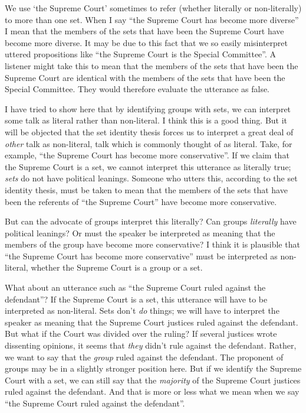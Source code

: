 \documentclass[11pt]{article}
\begin{document}
\begin{spacing}{1.5}
We use `the Supreme Court' sometimes to refer (whether literally or
non-literally) to more than one set.  When I say ``the Supreme Court
has become more diverse'' I mean that the members of the sets that
have been the Supreme Court have become more diverse.  It may be due
to this fact that we so easily misinterpret uttered propositions like
``the Supreme Court is the Special Committee''.  A listener might take
this to mean that the members of the sets that have been the Supreme
Court are identical with the members of the sets that have been the
Special Committee.  They would therefore evaluate the utterance as
false.

I have tried to show here that by identifying groups with sets, we can
interpret some talk as literal rather than non-literal.  I think this
is a good thing.  But it will be objected that the set identity thesis
forces us to interpret a great deal of {\em other} talk as
non-literal, talk which is commonly thought of as literal.  Take, for
example, ``the Supreme Court has become more conservative''.  If we
claim that the Supreme Court is a set, we cannot interpret this
utterance as literally true; {\em sets} do not have political
leanings.  Someone who utters this, according to the set identity
thesis, must be taken to mean that the members of the sets that have
been the referents of ``the Supreme Court'' have become more
conservative.

But can the advocate of groups interpret this literally?  Can groups
{\em literally} have political leanings?  Or must the speaker be
interpreted as meaning that the members of the group have become more
conservative?  I think it is plausible that ``the Supreme Court has
become more conservative'' must be interpreted as non-literal, whether
the Supreme Court is a group or a set.

What about an utterance such as ``the Supreme Court ruled against the
defendant''?  If the Supreme Court is a set, this utterance will have
to be interpreted as non-literal.  Sets don't {\em do} things; we will
have to interpret the speaker as meaning that the Supreme Court
justices ruled against the defendant.  But what if the Court was
divided over the ruling?  If several justices wrote dissenting
opinions, it seems that {\em they} didn't rule against the defendant.
Rather, we want to say that the {\em group} ruled against the
defendant.  The proponent of groups may be in a slightly stronger
position here.  But if we identify the Supreme Court with a set, we
can still say that the {\em majority} of the Supreme Court justices
ruled against the defendant.  And that is more or less what we mean
when we say ``the Supreme Court ruled against the defendant''.


\end{spacing}
\end{document}

